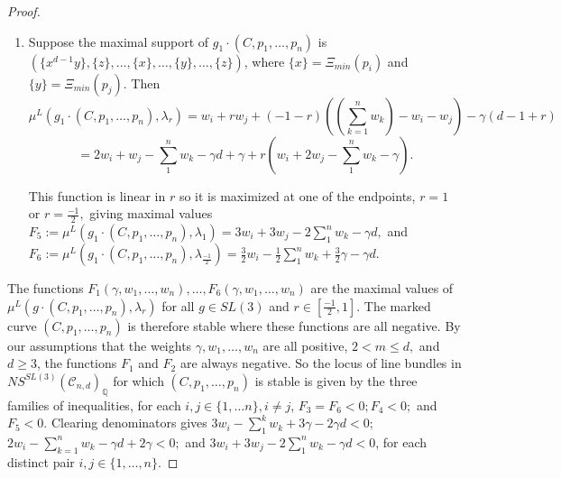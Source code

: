 \documentclass{amsart}
\newcommand{\Q}{\mathbb{Q}}
\newcommand{\mc}{\mathcal}
\numberwithin{equation}{section}
\theoremstyle{definition}
\begin{document}
\begin{proof}
\begin{enumerate}[label= (Case \arabic*):]
$$ = 2w_i - \sum_{j =1}^n w_j - \gamma d + 2 \gamma + \begin{cases}
    r(w_i - \sum_{j=1}^n w_j - 2 \gamma) \ \ \ \text{if} \ r \geq 0 \\
     r(w_i - \sum_{j=1}^n w_j + \gamma) \ \ \ \text{if} \ r \leq 0 
\end{cases}.$$
This is maximized when $r$ equals $\frac{-1}{2}$ or $0$, giving maximal values \\
$F_3 := \mu^L (g_2' \cdot (C, p_1, \dots , p_n), \lambda_{\frac{-1}{2}})= \frac{3}{2}w_i - \frac{1}{2}\sum_{j=1}^n w_j + \frac{3}{2} \gamma -  \gamma d$, and \\
$F_4 := \mu^L (g_2' \cdot (C, p_1, \dots , p_n), \lambda_0) = 2w_i - \sum_{j=1}^n w_j - \gamma d + 2 \gamma.$





\item  Suppose the maximal support of $g_1 \cdot (C, p_1, \dots , p_n)$ is $(\{x^{d-1}y\},  \{z\}, \dots , \{x\}, \dots , \{y\}, \dots ,\{z\})$, where $\{x\} = \Xi_{min}(p_i)$ and $\{y\} = \Xi_{min}(p_j)$. Then
$$\mu^L (g_1 \cdot (C, p_1, \dots , p_n), \lambda_r) = w_i + rw_j   + (-1-r)((\sum_{k=1}^n w_k)- w_i - w_j) - \gamma (d-1 + r)$$
$$ = 2w_i + w_j - \sum_1^n w_k  - \gamma d + \gamma       + r(w_i + 2w_j - \sum_1^n w_k - \gamma   ).$$

This function is linear in $r$ so it is maximized at one of the endpoints, $r=1$ or $r= \frac{-1}{2},$ giving maximal values \\
$F_5:=\mu^L ( g_1 \cdot (C, p_1, \dots , p_n), \lambda_1) = 3w_i + 3w_j - 2 \sum_1^n w_k - \gamma d,$ and \\
$F_6 :=\mu^L ( g_1 \cdot (C, p_1, \dots , p_n), \lambda_{\frac{-1}{2}}) = \frac{3}{2}w_i - \frac{1}{2}\sum_1^n w_k + \frac{3}{2} \gamma - \gamma d.$
    
\end{enumerate}

The functions $F_1 (\gamma, w_1, \dots , w_n) , \dots, F_6 (\gamma, w_1, \dots , w_n)$ are the maximal values of $\mu^L(g \cdot (C, p_1, \dots , p_n), \lambda_r)$ for all $g \in SL(3)$ and $r \in [\frac{-1}{2},1]$. The marked curve $(C, p_1, \dots , p_n)$ is therefore stable where these functions are all negative. By our assumptions that the weights $\gamma, w_1, \dots , w_n$ are all positive, $2 < m \leq d,$ and $d \geq 3$, the functions $F_1$ and $F_2$ are always negative. So the locus of line bundles in $NS^{SL(3)}(\mc{C}_{n,d})_{\Q}$ for which $(C, p_1, \dots , p_n)$ is stable is given by the three families of inequalities, for each $i,j \in \{1, \dots n\}, i \neq j$, $F_3 = F_6 < 0; F_4 < 0;$ and $F_5 < 0  $. Clearing denominators gives $3w_i - \sum_1^k w_k + 3 \gamma -2 \gamma d < 0;$ $2w_i - \sum_{k=1}^n w_k - \gamma d + 2 \gamma < 0;$ and $ 3w_i + 3w_j - 2 \sum_1^n w_k - \gamma d < 0$, for each distinct pair $i,j \in \{1, \dots , n\}$.
 \end{proof}  
\end{document}
